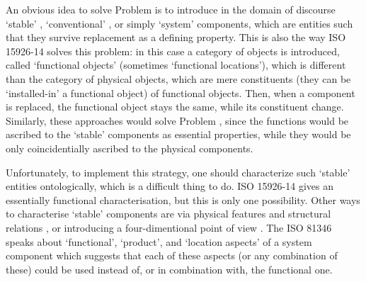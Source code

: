 \documentclass[
]{ceurart}
\begin{document}
An obvious idea to solve Problem  is to introduce in the domain of discourse `stable' \cite{compagnoComparingOntologicalAlternatives2021}, `conventional' \cite{guarinoArtefactualSystemsMissing2014}, or simply `system' \cite{westDevelopingHighQuality2011} components, which are entities such that they survive replacement as a defining property.   
This is also the way ISO 15926-14 \cite{kluwerISO159261420202020} solves this problem: in this case a category of objects is introduced, called `functional objects' (sometimes `functional locations'), which is different than the category of physical objects, which are mere constituents (they can be `installed-in' a functional object) of functional objects. Then, when a component is replaced, the functional object stays the same, while its constituent change. Similarly, these approaches would solve Problem , since the functions would be ascribed to the `stable' components as essential properties, while they would be only coincidentially ascribed to the physical components. 

Unfortunately, to implement this strategy, one should characterize such `stable' entities ontologically, which is a difficult thing to do.
ISO 15926-14 gives an essentially functional characterisation, but this is only one possibility. Other ways to characterise `stable' components are via physical features and structural relations \cite{compagnoComparingOntologicalAlternatives2021},  or introducing a four-dimentional point of view \cite{westDevelopingHighQuality2011}. The ISO 81346 \cite{ISOIEC8134612009} speaks about `functional', `product', and `location aspects' of a system component which suggests that each of these aspects (or any combination of these) could be used instead of, or in combination with, the functional one.
\end{document}
